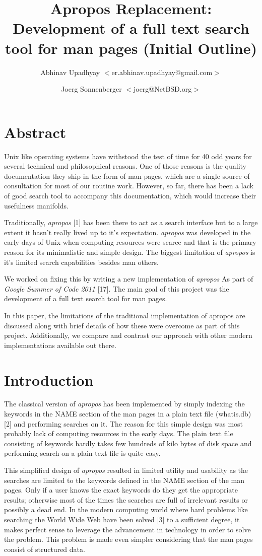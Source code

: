 \documentclass[titlepage, a4paper, 12pt]{article}
\title{Apropos Replacement: Development of a full text search tool for man pages \newline
(Initial Outline)}
\author{Abhinav Upadhyay $<$er.abhinav.upadhyay@gmail.com$>$ \and 
Joerg Sonnenberger $<$joerg@NetBSD.org$>$}
\begin{document}
\maketitle
\section{Abstract}
Unix like operating systems have withstood the test of time for 40 odd years for
several technical and philosophical reasons. One of those reasons is the
quality documentation they ship in the form of man pages, which are a single
source of consultation for most of our routine work. However, so far, there has been a lack of
good search tool to accompany this documentation, which would increase their
usefulness manifolds.

Traditionally, \textit{apropos} [1] has been there to act as a search
interface but to a large extent it hasn't really lived up to it's expectation.
\textit{apropos} was
developed in the early days of Unix when computing resources were scarce and
that is the primary reason for its minimalistic and simple design. The biggest
limitation of \textit{apropos} is it's limited search capabilities besides
man others.

We worked on fixing this by writing a new implementation of \textit{apropos} As part of \emph{Google Summer of Code 2011} [17]. The main goal of this project was
the development of a full text search tool for man pages.


In this paper, the limitations of the traditional implementation of apropos
are discussed along with brief details of how these were overcome as part of
this project. Additionally, we compare and contrast our approach with other
modern implementations available out there.

\section{Introduction}
The classical version of \textit{apropos} has been implemented by simply
indexing the keywords in the NAME section of the man pages in a plain text file
(whatis.db) [2]
and performing searches on it. The reason for this simple design was most
probably lack of computing resources in the early days. The plain text file
consisting of keywords hardly takes few hundreds of kilo bytes of disk space
and performing search on a plain text file is quite easy.

This simplified design of \textit{apropos} resulted in limited utility and
usability as the searches are limited to the keywords defined in the NAME
section of the man pages. Only if a user knows the exact keywords do they get
the appropriate results; otherwise most of
the times the searches are full of irrelevant results or possibly a dead end. In the modern
computing world where hard problems like searching the World Wide Web have been
solved [3] to a sufficient degree, it makes perfect sense to leverage the
advancement in technology in order to solve the problem. This problem is made
even simpler considering that the man pages consist of structured data.
\end{document}
